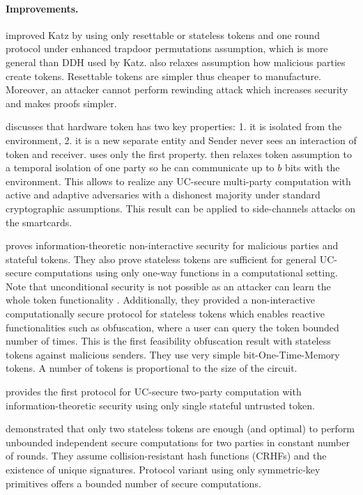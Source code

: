 \documentclass[
  digital, %
  twoside, %
  table,   %
  lof,     %
  lot,     %
]{fithesis3}
\newcommand{\cmmnt}[1]{\ignorespaces}
\newcounter{ph4_show_guides}
\theoremstyle{definition}
\theoremstyle{remark}
\begin{document}
\paragraph{Improvements.}%
\cite{CGS08} improved Katz by using only resettable or stateless tokens and one round protocol under enhanced trapdoor permutations assumption, which is more general than DDH used by Katz. \cite{CGS08} also relaxes assumption how malicious parties create tokens\cmmnt{Attacker does not need to know the code}. Resettable tokens are simpler thus cheaper to manufacture. Moreover, an attacker cannot perform rewinding attack which increases security and makes proofs simpler.

\cite{DNW09} discusses that hardware token has two key properties: 1. it is isolated from the environment, 2. it is a new separate entity and Sender never sees an interaction of token and receiver. \cite{K07} uses only the first property. \cite{DNW09} then relaxes token assumption to a temporal isolation of one party so he can communicate up to $b$ bits with the environment. This allows to realize any UC-secure multi-party computation with active and adaptive adversaries with a dishonest majority under standard cryptographic assumptions. This result can be applied to side-channels attacks on the smartcards.

\cite{GISVW10} proves information-theoretic non-interactive security for malicious parties and stateful tokens. They also prove stateless tokens are sufficient for general UC-secure computations using only one-way functions in a computational setting. Note that unconditional security is not possible as an attacker can learn the whole token functionality \cite{GIMS10}. Additionally, they provided a non-interactive computationally secure protocol for stateless tokens which enables reactive functionalities such as obfuscation, where a user can query the token bounded number of times. This is the first feasibility obfuscation result with stateless tokens against malicious senders. They use very simple bit-One-Time-Memory tokens. A number of tokens is proportional to the size of the circuit.

\cite{DKM11} provides the first protocol for UC-secure two-party computation with information-theoretic security using only single stateful untrusted token.

\cite{CKSYZ14} demonstrated that only two stateless tokens are enough (and optimal) to perform unbounded independent secure computations for two parties in constant number of rounds.
They assume collision-resistant hash functions (CRHFs) and the existence of unique signatures. Protocol variant using only symmetric-key primitives offers a bounded number of secure computations.
\end{document}
